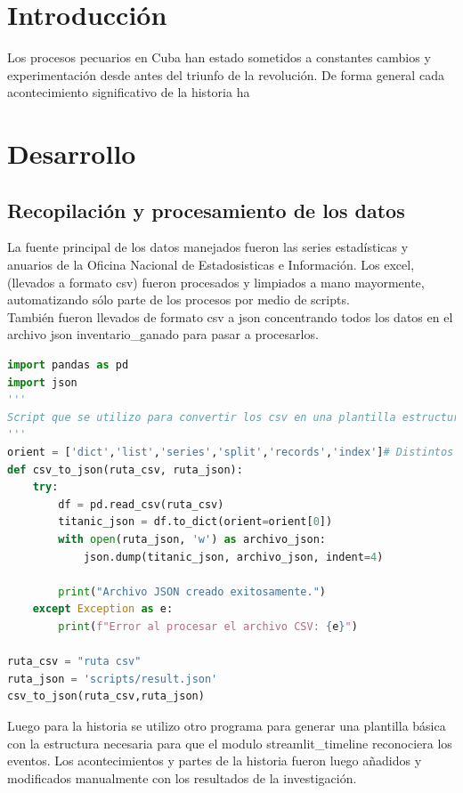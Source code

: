\documentclass{article}
\begin{document}
\section{Introducción}
Los procesos pecuarios en Cuba han estado sometidos a constantes cambios y experimentación desde antes del triunfo de la revolución. De forma general cada acontecimiento significativo de la historia ha 


\section{Desarrollo}
\subsection{Recopilación y procesamiento de los datos}
La fuente principal de los datos manejados fueron las series estadísticas y anuarios de la Oficina Nacional de Estadosisticas e Información. Los excel, (llevados a formato csv) fueron procesados y 
limpiados a mano mayormente, automatizando sólo parte de los procesos por medio de scripts. \\
También fueron llevados de formato csv a json concentrando todos los datos en el archivo json inventario\_ganado para pasar a procesarlos.

\begin{lstlisting}[language=Python, caption=Script para convertir CSV en Json]
import pandas as pd
import json
'''
Script que se utilizo para convertir los csv en una plantilla estructurada de diccionario (luego de limpiarlos) para luego desde esa estructura inicial ir reestructurando el 'inventraio_ganado.json'
'''
orient = ['dict','list','series','split','records','index']# Distintos tipos de orient para la generacion del diccionario 
def csv_to_json(ruta_csv, ruta_json):
    try:
        df = pd.read_csv(ruta_csv)    
        titanic_json = df.to_dict(orient=orient[0])    
        with open(ruta_json, 'w') as archivo_json:
            json.dump(titanic_json, archivo_json, indent=4)
            
        print("Archivo JSON creado exitosamente.")
    except Exception as e:
        print(f"Error al procesar el archivo CSV: {e}")
    
ruta_csv = "ruta csv"
ruta_json = 'scripts/result.json'
csv_to_json(ruta_csv,ruta_json)
\end{lstlisting}

Luego para la historia se utilizo otro programa para generar una plantilla básica con la estructura necesaria para que el modulo streamlit\_timeline reconociera los eventos. 
Los acontecimientos y partes de la historia fueron luego añadidos y modificados manualmente con los resultados de la investigación.
\end{document}

